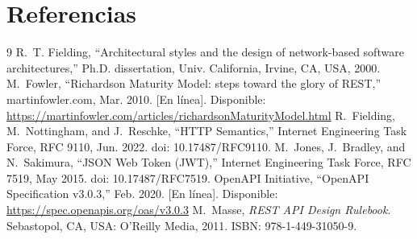 \documentclass[11pt,a4paper]{article}
\begin{document}
\section*{Referencias}
\begin{thebibliography}{9}
 R.~T. Fielding, ``Architectural styles and the design of network-based software architectures,'' Ph.D. dissertation, Univ. California, Irvine, CA, USA, 2000.
 M.~Fowler, ``Richardson Maturity Model: steps toward the glory of REST,'' martinfowler.com, Mar. 2010. [En línea]. Disponible: \url{https://martinfowler.com/articles/richardsonMaturityModel.html}
 R.~Fielding, M.~Nottingham, and J.~Reschke, ``HTTP Semantics,'' Internet Engineering Task Force, RFC 9110, Jun. 2022. doi: 10.17487/RFC9110.
 M.~Jones, J.~Bradley, and N.~Sakimura, ``JSON Web Token (JWT),'' Internet Engineering Task Force, RFC 7519, May 2015. doi: 10.17487/RFC7519.
 OpenAPI Initiative, ``OpenAPI Specification v3.0.3,'' Feb. 2020. [En línea]. Disponible: \url{https://spec.openapis.org/oas/v3.0.3}
 M.~Masse, \textit{REST API Design Rulebook}. Sebastopol, CA, USA: O'Reilly Media, 2011. ISBN: 978-1-449-31050-9.
\end{thebibliography}
\end{document}
